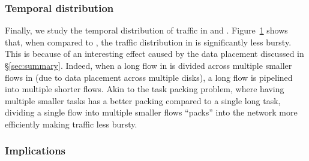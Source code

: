 \subsubsection{Temporal distribution}
Finally, we study the temporal distribution of traffic in \dis and \pdis. Figure~\ref{fig:td} shows that, when compared to \pdis, the traffic distribution in \dis is significantly less bursty. This is because of an interesting effect caused by the data placement discussed in \S\ref{sec:summary}. Indeed, when a long flow in \pdis is divided across multiple smaller flows in \dis (due to data placement across multiple disks), a long flow is pipelined into multiple shorter flows. Akin to the task packing problem, where having multiple smaller tasks has a better packing compared to a single long task, dividing a single flow into multiple smaller flows ``packs'' into the network more efficiently making traffic less bursty.
%
\begin{figure}
  \centering
  \caption{\small{}}
  \label{fig:td}
\end{figure}
%

\subsubsection{Implications}
\label{ssec:implications}

